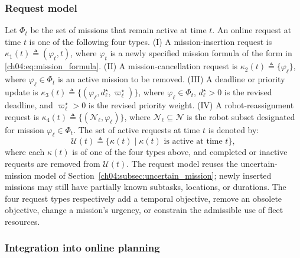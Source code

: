 \subsubsection{Request model}
\label{ch04:subsubsec:request_model}


Let $\Phi_t$ be the set of missions that remain active at time $t$. An online
request at time $t$ is one of the following four types.
(I) A mission-insertion request is
$\kappa_1(t) \triangleq (\varphi_t,t)$, where $\varphi_t$ is a newly specified
mission formula of the form in \eqref{ch04:eq:mission_formula}.
(II) A mission-cancellation request is
$\kappa_2(t) \triangleq \{\varphi_\ell\}$, where
$\varphi_\ell \in \Phi_t$ is an active mission to be removed.
(III) A deadline or priority update is
$\kappa_3(t) \triangleq \{(\varphi_\ell,d_\ell^\star,\varpi_\ell^\star)\}$,
where $\varphi_\ell \in \Phi_t$, $d_\ell^\star > 0$ is the revised deadline,
and $\varpi_\ell^\star > 0$ is the revised priority weight.
(IV) A robot-reassignment request is
$\kappa_4(t) \triangleq \{(\mathcal{N}_\ell,\varphi_\ell)\}$, where
$\mathcal{N}_\ell \subseteq \mathcal{N}$ is the robot subset designated for
mission $\varphi_\ell \in \Phi_t$.
The set of active requests at time $t$ is denoted by:
\begin{equation}
\label{ch04:eq:request_set}
\mathcal{U}(t) \triangleq
\{\kappa(t) \mid \kappa(t) \text{ is active at time } t\},
\end{equation}
where each $\kappa(t)$ is of one of the four types above, and completed or
inactive requests are removed from $\mathcal{U}(t)$.
The request model reuses the uncertain-mission model of
Section~\ref{ch04:subsec:uncertain_mission}; newly inserted missions may still
have partially known subtasks, locations, or durations. The four request types
respectively add a temporal objective, remove an obsolete objective, change a
mission's urgency, or constrain the admissible use of fleet resources.

\subsubsection{Integration into online planning}
\label{ch04:subsubsec:request_integration}

